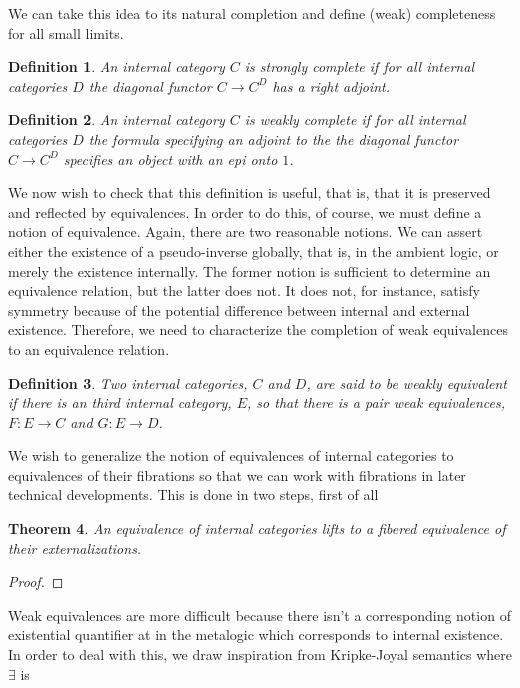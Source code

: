 \documentclass[12pt]{amsart}
\newcommand{\todo}[1]{{\color{red}{\LARGE #1}}}
\newtheorem{thm}{Theorem}[section]
\newtheorem{defn}[thm]{Definition}
\begin{document}
We can take this idea to its natural completion and define (weak)
completeness for all small limits.
\begin{defn}\label{defn:complete:complete}
  An internal category $C$ is strongly complete if for all internal
  categories $D$ the diagonal functor $C \to C^D$ has a right
  adjoint.
\end{defn}
\begin{defn}\label{defn:complete:weakcompletebroken}
  An internal category $C$ is weakly complete if for all internal
  categories $D$ the formula specifying an adjoint to the the diagonal
  functor $C \to C^D$ specifies an object with an epi onto $1$.
\end{defn}
We now wish to check that this definition is useful, that is, that it
is preserved and reflected by equivalences. In order to do this, of
course, we must define a notion of equivalence. Again, there are two
reasonable notions. We can assert either the existence of a
pseudo-inverse globally, that is, in the ambient logic, or merely the
existence internally. The former notion is sufficient to determine an
equivalence relation, but the latter does not. It does not, for
instance, satisfy symmetry because of the potential difference between
internal and external existence. Therefore, we need to characterize
the completion of weak equivalences to an equivalence relation.
\begin{defn}\label{defn:complete:weakequivalence}
  Two internal categories, $C$ and $D$, are said to be weakly
  equivalent if there is an third internal category, $E$, so that
  there is a pair weak equivalences, $F : E \to C$ and $G : E \to D$.
\end{defn}
We wish to generalize the notion of equivalences of internal
categories to equivalences of their fibrations so that we can work
with fibrations in later technical developments. This is done in two
steps, first of all
\begin{thm}\label{thm:complete:equivalencelifts}
  An equivalence of internal categories lifts to a fibered equivalence
  of their externalizations.
\end{thm}
\begin{proof}
  \todo{Should be a straightforward check}
\end{proof}
Weak equivalences are more difficult because there isn't a
corresponding notion of existential quantifier at in the metalogic
which corresponds to internal existence. In order to deal with this,
we draw inspiration from Kripke-Joyal semantics where $\exists$ is
\end{document}
